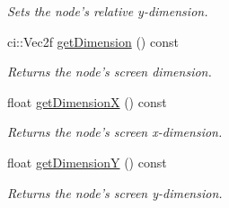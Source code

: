 \begin{DoxyCompactItemize}
\begin{DoxyCompactList}\small\item\em Sets the node's relative y-\/dimension. \end{DoxyCompactList}\item 
\hypertarget{class_gui_base_a940460c55f91a4132f871673f808e7a7}{ci\-::\-Vec2f \hyperlink{class_gui_base_a940460c55f91a4132f871673f808e7a7}{get\-Dimension} () const }\label{class_gui_base_a940460c55f91a4132f871673f808e7a7}

\begin{DoxyCompactList}\small\item\em Returns the node's screen dimension. \end{DoxyCompactList}\item 
\hypertarget{class_gui_base_a7a54ae06139a02532c51b1e198c24133}{float \hyperlink{class_gui_base_a7a54ae06139a02532c51b1e198c24133}{get\-Dimension\-X} () const }\label{class_gui_base_a7a54ae06139a02532c51b1e198c24133}

\begin{DoxyCompactList}\small\item\em Returns the node's screen x-\/dimension. \end{DoxyCompactList}\item 
\hypertarget{class_gui_base_af79e3089b3a018012e9acbd7fd29708a}{float \hyperlink{class_gui_base_af79e3089b3a018012e9acbd7fd29708a}{get\-Dimension\-Y} () const }\label{class_gui_base_af79e3089b3a018012e9acbd7fd29708a}

\begin{DoxyCompactList}\small\item\em Returns the node's screen y-\/dimension. \end{DoxyCompactList}\end{DoxyCompactItemize}
